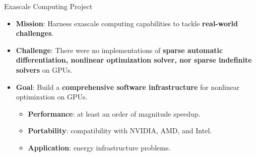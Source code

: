 \begin{frame}{Exascale Computing Project}
  \begin{itemize}
  \item {\bf Mission}: Harness exascale computing capabilities to tackle {\bf real-world challenges}.
    \begin{center}
    \end{center}
  \item<2-> {\bf Challenge}: There were no implementations of {\bf sparse automatic differentiation, nonlinear optimization solver, nor sparse indefinite solvers} on GPUs.
  \item<3-> {\bf Goal}: Build a {\bf comprehensive software infrastructure} for nonlinear optimization on GPUs.
    \begin{itemize}
    \item {\bf Performance}: at least an order of magnitude speedup.
    \item {\bf Portability}: compatibility with NVIDIA, AMD, and Intel.
    \item {\bf Application}: energy infrastructure problems.
    \end{itemize}
  \end{itemize}
\end{frame}

